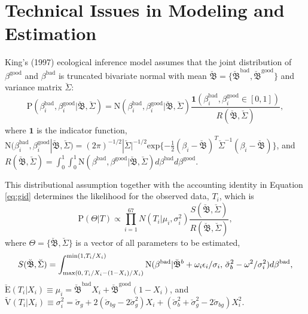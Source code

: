 \documentclass[11pt,titlepage]{article}
\newcommand{\bbetau}{\breve{\mathfrak B}}
\newcommand{\sigmau}{\breve{\sigma}}
\newcommand{\Sigmau}{\breve{\Sigma}}
\newcommand{\Eu}{\breve{\text{E}}}
\newcommand{\Vu}{\breve{\text{V}}}
\newcommand{\N}{\text{N}}
\renewcommand{\P}{\text{P}}
\newcommand{\bb}{\beta^{\text{bad}}}
\newcommand{\bg}{\beta^{\text{good}}}
\begin{document}
\appendix
\section{Technical Issues in Modeling and Estimation} \label{appx:king}

King's (1997) ecological inference model assumes that the joint
distribution of $\bg$ and $\bb$ is truncated bivariate normal with
mean $\bbetau=\{\bbetau^{\text{bad}},\bbetau^{\text{good}}\}$
and variance matrix $\Sigmau$:
\begin{equation}
\P(\bb_i, \bg_i | \bbetau, \Sigmau)  = 
 \N (\bb_i, \bg_i | \bbetau, \Sigmau)
\frac{\mathbf{1}(\bb_i, \bg_i \in [0,1])}
{R(\bbetau, \Sigmau)},
\end{equation}
where $\mathbf{1}$ is the indicator function, $\N (\bb_i, \bg_i |
\bbetau, \Sigmau) = (2 \pi)^{-1/2} |\Sigmau|^{-1/2} \text{exp} \{ -
\frac{1}{2} (\beta_i-\bbetau)^T \Sigmau^{-1} (\beta_i - \bbetau) \}$,
and $R (\bbetau, \Sigmau) = \int_0^1 \int_0^1 \N (\bb, \bg | \bbetau,
\Sigmau) d\bb d\bg$.

This distributional assumption together with the accounting identity
in Equation \ref{eq:gid} determines the likelihood for the observed
data, $T_i$, which is
\begin{equation}
  \P(\Theta|T) \propto \prod_{i=1}^{67} N(T_i|\mu_i, \sigma_i^2)
  \frac{S(\bbetau, \Sigmau)}{R(\bbetau, \Sigmau)}, \label{eq:likelihood}
\end{equation}
where $\Theta=\{\bbetau,\Sigmau\}$ is a vector of all parameters to be
estimated,
\begin{equation}
  S(\bbetau, \Sigmau)=\int_{\text{max}(0,\thinspace T_i/X_i-(1-X_i)/X_i)}
  ^{\text{min}(1,T_i/X_i)} \N(\bb|\bbetau^b + \omega_i \epsilon_i /
  \sigma_i,\thinspace \sigmau^2_b-\omega^2/\sigma^2_i)d\bb,
\end{equation}
$\Eu(T_i|X_i)\equiv\mu_i = \bbetau^{\text{bad}} X_i +
\bbetau^{\text{good}} (1-X_i)$, and
$\Vu(T_i|X_i)\equiv\sigma^2_i=\sigmau_g + 2(\sigmau_{bg} - 2
\sigmau_g^2) X_i + (\sigmau_b^2 + \sigmau_g^2 - 2\sigmau_{bg}) X_i^2$.
\end{document}

